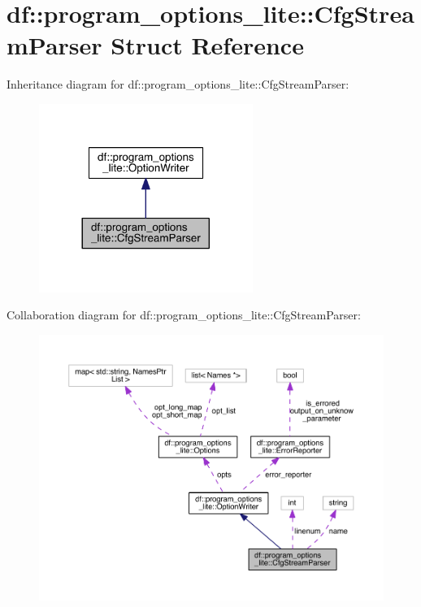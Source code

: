\hypertarget{structdf_1_1program__options__lite_1_1_cfg_stream_parser}{}\section{df\+:\+:program\+\_\+options\+\_\+lite\+:\+:Cfg\+Stream\+Parser Struct Reference}
\label{structdf_1_1program__options__lite_1_1_cfg_stream_parser}


Inheritance diagram for df\+:\+:program\+\_\+options\+\_\+lite\+:\+:Cfg\+Stream\+Parser\+:
\nopagebreak
\begin{figure}[H]
\begin{center}
\leavevmode
\includegraphics[width=197pt]{d6/ddc/structdf_1_1program__options__lite_1_1_cfg_stream_parser__inherit__graph}
\end{center}
\end{figure}


Collaboration diagram for df\+:\+:program\+\_\+options\+\_\+lite\+:\+:Cfg\+Stream\+Parser\+:
\nopagebreak
\begin{figure}[H]
\begin{center}
\leavevmode
\includegraphics[width=350pt]{d9/db1/structdf_1_1program__options__lite_1_1_cfg_stream_parser__coll__graph}
\end{center}
\end{figure}

